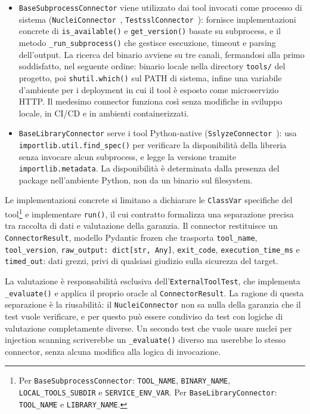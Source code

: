 \begin{itemize}
      \item \texttt{BaseSubprocessConnector} viene utilizzato dai tool invocati come processo di sistema (\texttt{NucleiConnector}~\cite{ProjectdiscoveryNuclei2026}, \texttt{TestsslConnector}~\cite{TestsslTestsslsh2026}): fornisce implementazioni concrete di \texttt{is\_available()} e \texttt{get\_version()} basate su subprocess, e il metodo \texttt{\_run\_subprocess()} che gestisce esecuzione, timeout e parsing dell'output. La ricerca del binario avviene su tre canali, fermandosi alla primo soddisfatto, nel seguente ordine: binario locale nella directory \texttt{tools/} del progetto, poi \texttt{shutil.which()} sul PATH di sistema, infine una variabile d'ambiente per i deployment in cui il tool è esposto come microservizio \gls{HTTP}. Il medesimo connector funziona così senza modifiche in sviluppo locale, in CI/CD e in ambienti containerizzati.
      \item \texttt{BaseLibraryConnector} serve i tool Python-native (\texttt{SslyzeConnector}~\cite{diquetNablac0d3Sslyze2026}): usa \texttt{importlib.util.find\_spec()} per verificare la disponibilità della libreria senza invocare alcun subprocess, e legge la versione tramite \texttt{importlib.metadata}. La disponibilità è determinata dalla presenza del package nell'ambiente Python, non da un binario sul filesystem.
\end{itemize}

Le implementazioni concrete si limitano a dichiarare le \texttt{ClassVar} specifiche del tool\footnote{Per \texttt{BaseSubprocessConnector}: \texttt{TOOL\_NAME}, \texttt{BINARY\_NAME}, \texttt{LOCAL\_TOOLS\_SUBDIR} e \texttt{SERVICE\_ENV\_VAR}. Per \texttt{BaseLibraryConnector}: \texttt{TOOL\_NAME} e \texttt{LIBRARY\_NAME}.}
e implementare \texttt{run()}, il cui contratto formalizza una separazione precisa tra raccolta di dati e valutazione della garanzia. Il connector restituisce un \texttt{ConnectorResult}, modello Pydantic frozen che trasporta \texttt{tool\_name}, \texttt{tool\_version}, \texttt{raw\_output: dict[str, Any]}, \texttt{exit\_code}, \texttt{execution\_time\_ms} e \texttt{timed\_out}: dati grezzi, privi di qualsiasi giudizio sulla sicurezza del target.

La valutazione è responsabilità esclusiva dell'\texttt{ExternalToolTest}, che implementa \texttt{\_evaluate()} e applica il proprio oracle al \texttt{ConnectorResult}. La ragione di questa separazione è la riusabilità: il \texttt{NucleiConnector} non sa nulla della garanzia che il test vuole verificare, e per questo può essere condiviso da test con logiche di valutazione completamente diverse. Un secondo test che vuole usare nuclei per injection scanning scriverebbe un \texttt{\_evaluate()} diverso ma userebbe lo stesso connector, senza alcuna modifica alla logica di invocazione.


